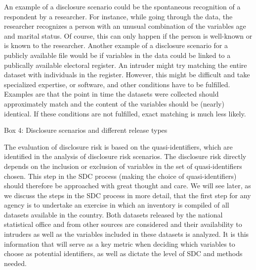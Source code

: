 \documentclass[letterpaper,10pt,english]{sphinxmanual}
\begin{document}
An example of a disclosure scenario could be the spontaneous recognition
of a respondent by a researcher. For instance, while going through the
data, the researcher recognizes a person with an unusual combination of
the variables age and marital status. Of course, this can only happen if
the person is well-known or is known to the researcher. Another example
of a disclosure scenario for a publicly available file would be if
variables in the data could be linked to a publically available
electoral register. An intruder might try matching the entire dataset
with individuals in the register. However, this might be difficult and
take specialized expertise, or software, and other conditions have to be
fulfilled. Examples are that the point in time the datasets were
collected should approximately match and the content of the variables
should be (nearly) identical. If these conditions are not fulfilled,
exact matching is much less likely. 

Box 4: Disclosure scenarios and different release types

The evaluation of disclosure risk is based on the quasi-identifiers,
which are identified in the analysis of disclosure risk scenarios. The
disclosure risk directly depends on the inclusion or exclusion of
variables in the set of quasi-identifiers chosen. This step in the SDC
process (making the choice of quasi-identifiers) should therefore be
approached with great thought and care. We will see later, as we discuss
the steps in the SDC process in more detail, that the first step for any
agency is to undertake an exercise in which an inventory is compiled of
all datasets available in the country. Both datasets released by the
national statistical office and from other sources are considered and
their availability to intruders as well as the variables included in
these datasets is analyzed. It is this information that will serve as a
key metric when deciding which variables to choose as potential
identifiers, as well as dictate the level of SDC and methods needed.
\end{document}
